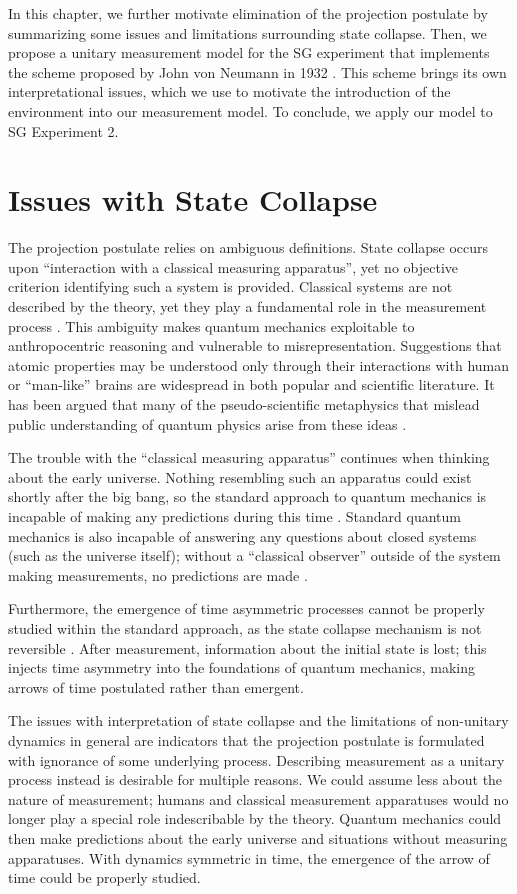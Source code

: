 In this chapter, we further motivate elimination of the projection postulate by summarizing some issues and limitations surrounding state collapse. Then, we propose a unitary measurement model for the SG experiment that implements the scheme proposed by John von Neumann in 1932 \cite{Neumann}. This scheme brings its own interpretational issues, which we use to motivate the introduction of the environment into our measurement model. To conclude, we apply our model to SG Experiment 2.

\section{Issues with State Collapse}
The projection postulate relies on ambiguous definitions. State collapse occurs upon ``interaction with a classical measuring apparatus'', yet no objective criterion identifying such a system is provided. Classical systems are not described by the theory, yet they play a fundamental role in the measurement process \cite{landau}. This ambiguity makes quantum mechanics exploitable to anthropocentric reasoning and vulnerable to misrepresentation. Suggestions that atomic properties may be understood only through their interactions with human or ``man-like'' brains are widespread in both popular \cite{Capra} and scientific \cite{stapp} literature. It has been argued that many of the pseudo-scientific metaphysics that mislead public understanding of quantum physics arise from these ideas \cite{stenger}.

The trouble with the ``classical measuring apparatus'' continues when thinking about the early universe. Nothing resembling such an apparatus could exist shortly after the big bang, so the standard approach to quantum mechanics is incapable of making any predictions during this time \cite{Craig}. Standard quantum mechanics is also incapable of answering any questions about closed systems (such as the universe itself); without a ``classical observer'' outside of the system making measurements, no predictions are made \cite{Craig}.

Furthermore, the emergence of time asymmetric processes cannot be properly studied within the standard approach, as the state collapse mechanism is not reversible \cite{mann}. After measurement, information about the initial state is lost; this injects time asymmetry into the foundations of quantum mechanics, making arrows of time postulated rather than emergent.

The issues with interpretation of state collapse and the limitations of non-unitary dynamics in general are indicators that the projection postulate is formulated with ignorance of some underlying process. Describing measurement as a unitary process instead is desirable for multiple reasons. We could assume less about the nature of measurement; humans and classical measurement apparatuses would no longer play a special role indescribable by the theory. Quantum mechanics could then make predictions about the early universe and situations without measuring apparatuses. With dynamics symmetric in time, the emergence of the arrow of time could be properly studied.

